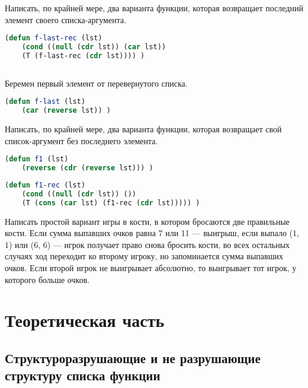 \documentclass[a4paper,oneside,12pt]{extreport}
\begin{document}
\begin{task}
	Написать, по крайней мере, два варианта функции, которая возвращает последний элемент своего списка-аргумента.

	\begin{lstlisting}[language=Lisp]
(defun f-last-rec (lst)
	(cond ((null (cdr lst)) (car lst))
	(T (f-last-rec (cdr lst)))) )
	
	\end{lstlisting}

Беремен первый элемент от перевернутого списка.
	\begin{lstlisting}[language=Lisp]
(defun f-last (lst)
	(car (reverse lst)) )
	\end{lstlisting}
\end{task}

\begin{task}
	Написать, по крайней мере, два варианта функции, которая возвращает свой список-аргумент без последнего элемента.

	\begin{lstlisting}[language=Lisp]
(defun f1 (lst)
	(reverse (cdr (reverse lst))) )
	\end{lstlisting}
	
	\vspace*{4.5em plus .6em minus .5em}

	\begin{lstlisting}[language=Lisp]
(defun f1-rec (lst)
	(cond ((null (cdr lst)) ())
	(T (cons (car lst) (f1-rec (cdr lst))))) )
	\end{lstlisting}
\end{task}

\begin{task}
	Написать простой вариант игры в кости, в котором бросаются две правильные кости.
	Если сумма выпавших очков равна 7 или 11 — выигрыш, если выпало (1, 1) или (6, 6) — игрок получает право снова бросить кости, во всех остальных случаях ход переходит ко второму игроку, но запоминается сумма выпавших очков.
	Если второй игрок не выигрывает абсолютно, то выигрывает тот игрок, у которого больше очков.

\end{task}

\newpage

\section*{Теоретическая часть}

\subsection*{Структуроразрушающие и не разрушающие структуру списка функции}
\end{document}
